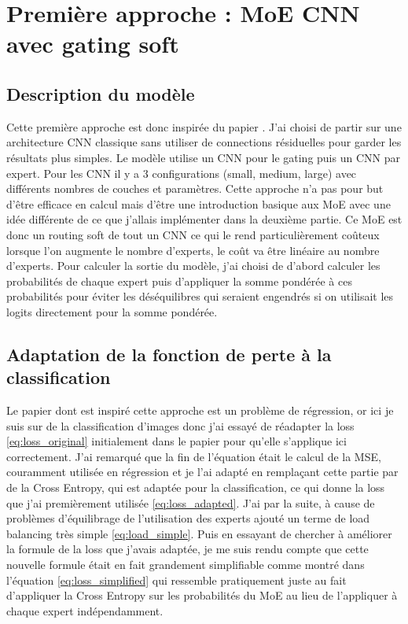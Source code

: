 \documentclass{article}
\begin{document}
\section{Première approche : MoE CNN avec gating soft}

\subsection{Description du modèle}

Cette première approche est donc inspirée du papier \cite{paper1}. J'ai choisi de partir sur une architecture CNN classique sans utiliser de connections résiduelles pour garder les résultats plus simples. Le modèle utilise un CNN pour le gating puis un CNN par expert. Pour les CNN il y a 3 configurations (small, medium, large) avec différents nombres de couches et paramètres. Cette approche n'a pas pour but d'être efficace en calcul mais d'être une introduction basique aux MoE avec une idée différente de ce que j'allais implémenter dans la deuxième partie. Ce MoE est donc un routing soft de tout un CNN ce qui le rend particulièrement coûteux lorsque l'on augmente le nombre d'experts, le coût va être linéaire au nombre d'experts. Pour calculer la sortie du modèle, j'ai choisi de d'abord calculer les probabilités de chaque expert puis d'appliquer la somme pondérée à ces probabilités pour éviter les déséquilibres qui seraient engendrés si on utilisait les logits directement pour la somme pondérée.

\subsection{Adaptation de la fonction de perte à la classification}

Le papier \cite{paper1} dont est inspiré cette approche est un problème de régression, or ici je suis sur de la classification d'images donc j'ai essayé de réadapter la loss \eqref{eq:loss_original} initialement dans le papier pour qu'elle s'applique ici correctement. J'ai remarqué que la fin de l'équation était le calcul de la MSE, couramment utilisée en régression et je l'ai adapté en remplaçant cette partie par de la Cross Entropy, qui est adaptée pour la classification, ce qui donne la loss que j'ai premièrement utilisée \eqref{eq:loss_adapted}. J'ai par la suite, à cause de problèmes d'équilibrage de l'utilisation des experts ajouté un terme de load balancing très simple \eqref{eq:load_simple}. Puis en essayant de chercher à améliorer la formule de la loss que j'avais adaptée, je me suis rendu compte que cette nouvelle formule était en fait grandement simplifiable comme montré dans l'équation \eqref{eq:loss_simplified} qui ressemble pratiquement juste au fait d'appliquer la Cross Entropy sur les probabilités du MoE au lieu de l'appliquer à chaque expert indépendamment.
\end{document}
